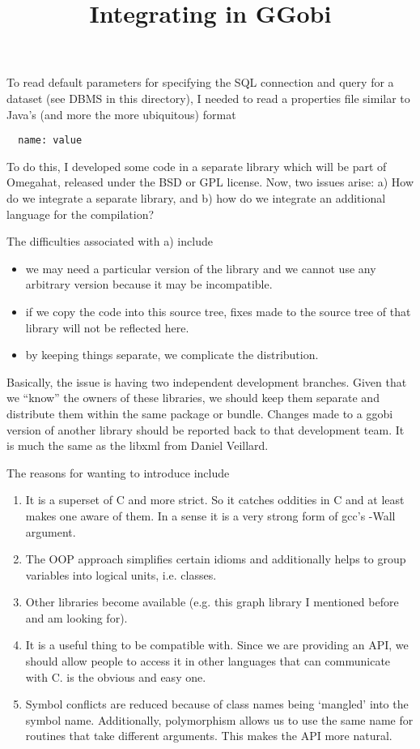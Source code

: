 \documentclass{article}
\title{Integrating \Cplus{} in GGobi}
\begin{document}
\maketitle
To read default parameters for specifying the SQL connection and query
for a dataset (see DBMS in this directory), I needed to read a
properties file similar to Java's (and more the more ubiquitous)
format
\begin{verbatim}
  name: value
\end{verbatim}
To do this, I developed some \Cplus{} code in a separate library which
will be part of Omegahat, released under the BSD or GPL license.
Now, two issues arise: a) How do we integrate
a separate library, and b) how do we integrate an
additional language for the compilation?

The difficulties associated with a)  include
\begin{itemize}
\item we may need a particular version of the library
and we cannot use any arbitrary version
because it may be incompatible.
\item if we copy the code into this source tree,
fixes made to the source tree of that library will not
be reflected here.
\item by keeping things separate, we complicate 
the distribution.
\end{itemize}
Basically, the issue is having two independent development branches.
Given that we ``know'' the owners of these libraries, we should keep
them separate and distribute them within the same package or bundle.
Changes made to a ggobi version of another library should be reported
back to that development team.  It is much the same as the libxml from
Daniel Veillard.


The reasons for wanting to introduce \Cplus{} include
\begin{enumerate}
\item It is a superset of C and more strict.  So it catches oddities
in C and at least makes one aware of them.  In a sense it is a very
strong form of gcc's -Wall argument.
\item The OOP approach simplifies certain
idioms and additionally helps to group variables
into logical units, i.e. classes.
\item Other libraries become available (e.g. this graph library
I mentioned before and am looking for).
\item It is a useful thing to be compatible with.  Since we are
providing an API, we should allow people to access it in other
languages that can communicate with C.  \Cplus{} is the obvious and
easy one.
\item Symbol conflicts are reduced because of class names being
`mangled' into the symbol name.  Additionally, polymorphism allows us
to use the same name for routines that take different arguments. This
makes the API more natural.
\end{enumerate}
\end{document}
